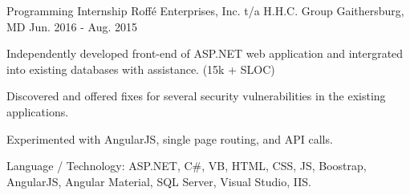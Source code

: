 

\begin{cventries}

  \cventry
    {Programming Internship} %
    {Roffé Enterprises, Inc. t/a H.H.C. Group} %
    {Gaithersburg, MD} %
    {Jun. 2016 - Aug. 2015} %
    {
      \begin{cvitems} %
       \item {Independently developed front-end of ASP.NET web application and intergrated into existing databases with assistance. (15k + SLOC)}
       \item {Discovered and offered fixes for several security vulnerabilities in the existing applications.}
	\item {Experimented with AngularJS, single page routing, and API calls.}
\item {Language / Technology: ASP.NET,  C\#, VB, HTML, CSS, JS, Boostrap, AngularJS, Angular Material, SQL Server, Visual Studio, IIS. }
      \end{cvitems}
    }



\end{cventries}
